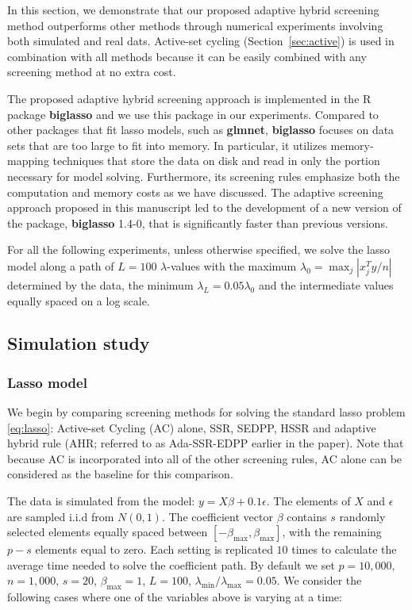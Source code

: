 In this section, we demonstrate that our proposed adaptive hybrid screening method outperforms other methods through numerical experiments involving both simulated and real dats. Active-set cycling (Section~\ref{sec:active}) is used in combination with all methods because it can be easily combined with any screening method at no extra cost.

The proposed adaptive hybrid screening approach is implemented in the R package \textbf{biglasso} and we use this package in our experiments. Compared to other packages that fit lasso models, such as \textbf{glmnet}, \textbf{biglasso} focuses on data sets that are too large to fit into memory. In particular, it utilizes memory-mapping techniques that store the data on disk and read in only the portion necessary for model solving. Furthermore, its screening rules emphasize both the computation and memory costs as we have discussed. The adaptive screening approach proposed in this manuscript led to the development of a new version of the package, \textbf{biglasso} 1.4-0, that is significantly faster than previous versions.

For all the following experiments, unless otherwise specified, we solve the lasso model along a path of $L=100$ $\lambda$-values with the maximum $\lambda_0=\max_j|x_j^Ty/n|$ determined by the data, the minimum $\lambda_L=0.05\lambda_0$ and the intermediate values equally spaced on a log scale. 

\subsection{Simulation study}
\label{sec:sim}

\subsubsection{Lasso model}

We begin by comparing screening methods for solving the standard lasso problem \eqref{eq:lasso}: Active-set Cycling (AC) alone, SSR, SEDPP, HSSR and adaptive hybrid rule (AHR; referred to as Ada-SSR-EDPP earlier in the paper). Note that because AC is incorporated into all of the other screening rules, AC alone can be considered as the baseline for this comparison.

The data is simulated from the model: $y=X\beta+0.1\epsilon$. The elements of $X$ and $\epsilon$ are sampled i.i.d from $N(0,1)$. The coefficient vector $\beta$ contains $s$ randomly selected elements equally spaced between $[-\beta_{\max},\beta_{\max}]$, with the remaining $p-s$ elements equal to zero. Each setting is replicated $10$ times to calculate the average time needed to solve the coefficient path. By default we set $p=10,000$, $n=1,000$, $s=20$, $\beta_{\max}=1$, $L=100$, $\lambda_{\min}/\lambda_{\max}=0.05$. We consider the following cases where one of the variables above is varying at a time:

